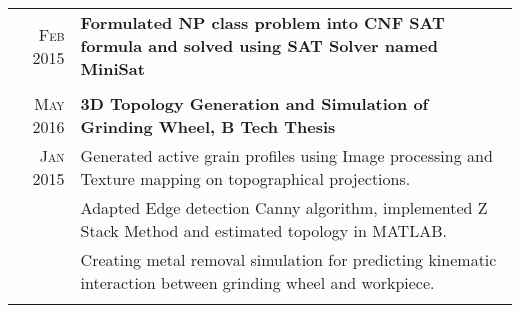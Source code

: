 \documentclass[a4paper,10pt]{article}
\begin{document}
\begin{longtable}{r|p{16cm}}
\textsc{Feb 2015} & \textbf{Formulated NP class problem into CNF SAT formula and solved using SAT Solver named MiniSat} \\\multicolumn{2}{c}{}\\

\textsc{May 2016} & \textbf{3D Topology Generation and Simulation of Grinding Wheel, B Tech Thesis} \\
\textsc{Jan 2015} & Generated active grain profiles using Image processing and Texture mapping on topographical projections.\\
& Adapted Edge detection Canny algorithm, implemented Z Stack Method and estimated topology in MATLAB.\\
& Creating metal removal simulation for predicting kinematic interaction between grinding wheel and workpiece.\\\multicolumn{2}{c}{}\\

\end{longtable}

\end{document}
